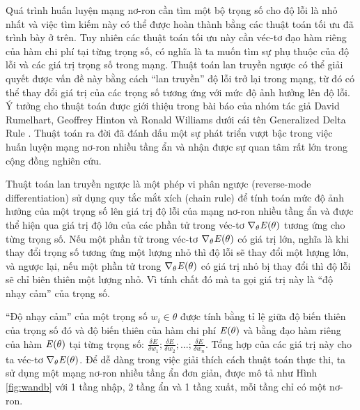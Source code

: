 Quá trình huấn luyện mạng nơ-ron cần tìm một bộ trọng số cho độ lỗi là nhỏ nhất và việc tìm kiếm này có thể được hoàn thành bằng các thuật toán tối ưu đã trình bày ở trên. Tuy nhiên các thuật toán tối ưu này cần véc-tơ đạo hàm riêng của hàm chi phí tại từng trọng số, có nghĩa là ta muốn tìm sự phụ thuộc của độ lỗi và các giá trị trọng số trong mạng. Thuật toán lan truyền ngược có thể giải quyết được vấn đề này bằng cách ``lan truyền'' độ lỗi trở lại trong mạng, từ đó có thể thay đổi giá trị của các trọng số tương ứng với mức độ ảnh hưởng lên độ lỗi. Ý tưởng cho thuật toán được giới thiệu trong bài báo của nhóm tác giả David Rumelhart, Geoffrey Hinton và Ronald Williams dưới cái tên Generalized Delta Rule \cite{rumelhart1986learning}. Thuật toán ra đời đã đánh dấu một sự phát triển vượt bậc trong việc huấn luyện mạng nơ-ron nhiều tầng ẩn và nhận được sự quan tâm rất lớn trong cộng đồng nghiên cứu.

Thuật toán lan truyền ngược là một phép vi phân ngược (reverse-mode differentiation) sử dụng quy tắc mắt xích (chain rule) để tính toán mức độ ảnh hưởng của một trọng số lên giá trị độ lỗi của mạng nơ-ron nhiều tầng ẩn và được thể hiện qua giá trị độ lớn của các phần tử trong véc-tơ $\nabla_\theta \mathbf{\it{E}(\theta)}$ tương ứng cho từng trọng số. Nếu một phần tử trong véc-tơ $\nabla_\theta \mathbf{\it{E}(\theta)}$ có giá trị lớn, nghĩa là khi thay đổi trọng số tương ứng một lượng nhỏ thì độ lỗi sẽ thay đổi một lượng lớn, và ngược lại, nếu một phần tử trong $\nabla_\theta \mathbf{\it{E}(\theta)}$ có giá trị nhỏ bị thay đổi thì độ lỗi sẽ chỉ biên thiên một lượng nhỏ. Vì tính chất đó mà ta gọi giá trị này là ``độ nhạy cảm'' của trọng số.

``Độ nhạy cảm'' của một trọng số $w_i \in \theta$ được tính bằng tỉ lệ giữa độ biến thiên của trọng số đó và độ biến thiên của hàm chi phí $\mathbf{\it{E}(\theta)}$ và bằng đạo hàm riêng của hàm $\mathbf{\it{E}(\theta)}$ tại từng trọng số: $\frac{\delta E}{\delta w_1}; \frac{\delta E}{\delta w_2};...;\frac{\delta E}{\delta w_n}$. Tổng hợp của các giá trị này cho ta véc-tơ $\nabla_\theta \mathbf{\it{E}(\theta)}$. Để dễ dàng trong việc giải thích cách thuật toán thực thi, ta sử dụng một mạng nơ-ron nhiều tầng ẩn đơn giản, được mô tả như Hình \ref{fig:wandb} với 1 tầng nhập, 2 tầng ẩn và 1 tầng xuất, mỗi tầng chỉ có một nơ-ron.

